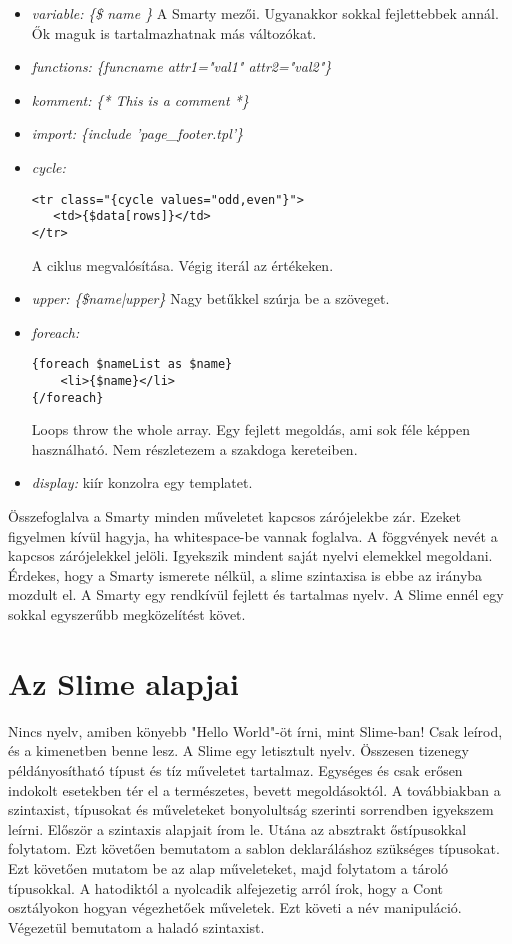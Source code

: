 \begin{itemize}
\item \emph{variable: }
\textit{\{\$ name \}}
A Smarty mezői.
Ugyanakkor sokkal fejlettebbek annál.
Ők maguk is tartalmazhatnak más változókat. 
\item \emph{functions: }
\textit{\{funcname attr1="val1" attr2="val2"\}}
\item \emph{komment: } 
\textit{\{* This is a comment *\}}
\item \emph{import: } 
\textit{\{include 'page\_footer.tpl'\}}
\item \emph{cycle: }
\begin{verbatim}
<tr class="{cycle values="odd,even"}">
   <td>{$data[rows]}</td>
</tr>
\end{verbatim}
A ciklus megvalósítása. 
Végig iterál az értékeken.
\item \emph{upper: } 
\textit{\{\$name|upper\}}
Nagy betűkkel szúrja be a szöveget.
\item \emph{foreach: } 
\begin{verbatim}
{foreach $nameList as $name}
    <li>{$name}</li>
{/foreach}
\end{verbatim}
Loops throw the whole array.
Egy fejlett megoldás, ami sok féle képpen használható.
Nem részletezem a szakdoga kereteiben.
\item \emph{display: } 
kiír konzolra egy templatet.
\end{itemize}

Összefoglalva a Smarty minden műveletet kapcsos zárójelekbe zár.
Ezeket figyelmen kívül hagyja, ha whitespace-be vannak foglalva.
A föggvények nevét a kapcsos zárójelekkel jelöli.
Igyekszik mindent saját nyelvi elemekkel megoldani.
Érdekes, hogy a Smarty ismerete nélkül, a slime szintaxisa is ebbe az irányba mozdult el.
A Smarty egy rendkívül fejlett és tartalmas nyelv.
A Slime ennél egy sokkal egyszerűbb megközelítést követ.

\section{Az Slime alapjai}
\label{sec:basics}
Nincs nyelv, amiben könyebb "Hello World"-öt írni, mint Slime-ban!
Csak leírod, és a kimenetben benne lesz.
A Slime egy letisztult nyelv. 
Összesen tizenegy példányosítható típust és tíz műveletet tartalmaz. 
Egységes és csak erősen indokolt esetekben tér el a természetes, bevett megoldásoktól.
A továbbiakban a szintaxist, típusokat és műveleteket bonyolultság szerinti sorrendben igyekszem leírni.
Először a szintaxis alapjait írom le.
Utána az absztrakt őstípusokkal folytatom.
Ezt követően bemutatom a sablon deklaráláshoz szükséges típusokat.
Ezt követően mutatom be az alap műveleteket,
majd folytatom a tároló típusokkal.
A hatodiktól a nyolcadik alfejezetig arról írok, hogy a Cont osztályokon hogyan végezhetőek műveletek.
Ezt követi a név manipuláció.
Végezetül bemutatom a haladó szintaxist.

